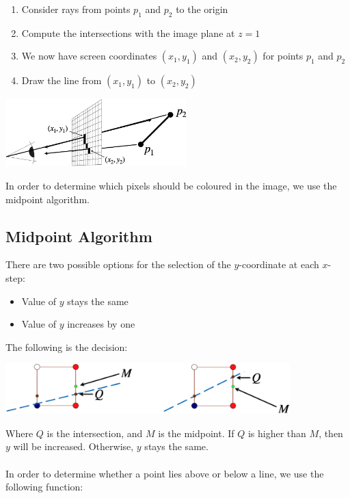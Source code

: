 \documentclass{article}
\begin{document}
\begin{enumerate}
	\item Consider rays from points $p_1$ and $p_2$ to the origin
	\item Compute the intersections with the image plane at $z = 1$
	\item We now have screen coordinates $(x_1, y_1)$ and $(x_2, y_2)$ for points $p_1$ and $p_2$
	\item Draw the line from $(x_1, y_1)$ to $(x_2, y_2)$
\end{enumerate}
\vspace{.0cm}
\begin{center}
	\includegraphics[width=7cm]{rasterization.png}
\end{center}
\vspace{.3cm}
In order to determine which pixels should be coloured in the image, we use the midpoint algorithm.

\subsection{Midpoint Algorithm}
There are two possible options for the selection of the $y$-coordinate at each $x$-step:

\begin{itemize}
	\item Value of $y$ stays the same
	\item Value of $y$ increases by one
\end{itemize}
The following is the decision: \\
\begin{center}
	\includegraphics[width=11cm]{midpoint.png}
\end{center}
\vspace{.3cm}
Where $Q$ is the intersection, and $M$ is the midpoint. If $Q$ is higher than $M$, then $y$ will be increased. Otherwise, $y$ stays the same. \\ \\
In order to determine whether a point lies above or below a line, we use the following function:
\end{document}

